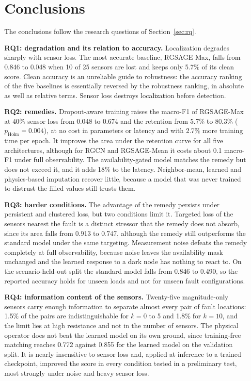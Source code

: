 \documentclass[MTech]{ugthesis}
\begin{document}
\section{Conclusions}

The conclusions follow the research questions of Section~\ref{sec:rq}.

\textbf{RQ1: degradation and its relation to accuracy.} Localization degrades sharply with sensor loss. The most accurate baseline, RGSAGE-Max, falls from 0.846 to 0.048 when 10 of 25 sensors are lost and keeps only 5.7\% of its clean score. Clean accuracy is an unreliable guide to robustness: the accuracy ranking of the five baselines is essentially reversed by the robustness ranking, in absolute as well as relative terms. Sensor loss destroys localization before detection.

\textbf{RQ2: remedies.} Dropout-aware training raises the macro-F1 of RGSAGE-Max at 40\% sensor loss from 0.048 to 0.674 and the retention from 5.7\% to 80.3\% ($p_{\mathrm{Holm}}=0.004$), at no cost in parameters or latency and with 2.7\% more training time per epoch. It improves the area under the retention curve for all five architectures, although for RGCN and RGSAGE-Mean it costs about 0.1 macro-F1 under full observability. The availability-gated model matches the remedy but does not exceed it, and it adds 18\% to the latency. Neighbor-mean, learned and physics-based imputation recover little, because a model that was never trained to distrust the filled values still trusts them.

\textbf{RQ3: harder conditions.} The advantage of the remedy persists under persistent and clustered loss, but two conditions limit it. Targeted loss of the sensors nearest the fault is a distinct stressor that the remedy does not absorb, since its area falls from 0.913 to 0.747, although the remedy still outperforms the standard model under the same targeting. Measurement noise defeats the remedy completely at full observability, because noise leaves the availability mask unchanged and the learned response to a dark node has nothing to react to. On the scenario-held-out split the standard model falls from 0.846 to 0.490, so the reported accuracy holds for unseen loads and not for unseen fault configurations.

\textbf{RQ4: information content of the sensors.} Twenty-five magnitude-only sensors carry enough information to separate almost every pair of fault locations: 1.5\% of the pairs are indistinguishable for $k=0$ to 5 and 1.8\% for $k=10$, and the limit lies at high resistance and not in the number of sensors. The physical operator does not beat the learned model on its own ground, since training-free matching reaches 0.772 against 0.855 for the learned model on the validation split. It is nearly insensitive to sensor loss and, applied at inference to a trained checkpoint, improved the score in every condition tested in a preliminary test, most strongly under noise and heavy sensor loss.
\end{document}
